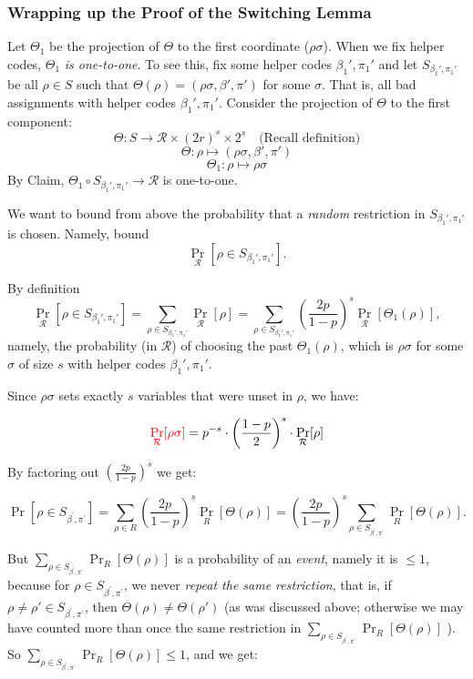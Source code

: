 \begin{note}
\subsubsection{Wrapping up  the Proof of the Switching Lemma}


Let \( \Theta_1 \) be the projection of \( \Theta \) to the first coordinate (\(\rho{\sigma}\)).
   When we fix helper codes, \( \Theta_1 \) \emph{is one-to-one}.
To see this, fix some helper codes \( \beta_1', \pi_1' \) and let \( S_{\beta_1', \pi_1'} \) be all \( \rho \in S \) such that \( \Theta(\rho) = (\rho{\sigma}, \beta', \pi') \) for some \( \sigma \). That is, all bad assignments with helper codes \( \beta_1', \pi_1' \).
Consider the projection of \( \Theta \) to the first component:
\[
\Theta: S \to \mathcal{R} \times (2r)^s \times 2^s \quad \text{(Recall definition)}
\]
\[
\Theta: \rho \mapsto (\rho{\sigma}, \beta', \pi')
\]
\[
\Theta_1: \rho \mapsto \rho{\sigma}
\]
By Claim, \( \Theta_1 \circ S_{\beta_1',\pi_1'} \to \mathcal{R} \) is one-to-one.

\medskip 
We want to bound from above the probability that a \textit{random} restriction in \( S_{\beta_1', \pi_1'} \) is chosen.
Namely, bound
\[
\Pr_{\mathcal{R}} [\rho \in S_{\beta_1', \pi_1'}].
\]

By definition
\[
\Pr_{\mathcal{R}} [\rho \in S_{\beta_1', \pi_1'}] = \sum_{\rho \in S_{\beta_1', \pi_1'}} \Pr_{\mathcal{R}} [\rho] = \sum_{\rho \in S_{\beta_1', \pi_1'}} \left( \frac{2p}{1-p} \right)^s \Pr_{\mathcal{R}} [\Theta_1(\rho)],
\]
namely, the probability (in \( \mathcal{R} \)) of choosing the past \( \Theta_1(\rho) \), which is \( \rho{\sigma} \) for some \( \sigma \) of size \( s \) with helper codes \( \beta_1', \pi_1' \).

 
Since \( \rho\sigma \) sets exactly \( s \) variables that were unset in \( \rho \), we have:

\[
\textcolor{red}{\Pr_{\mathcal{R}} [\rho\sigma]} = p^{-s} \cdot \left( \frac{1-p}{2} \right)^s \cdot \Pr_{\mathcal{R}} [\rho]
\]

By factoring out \( \left( \frac{2p}{1 - p} \right)^s \) we get:

\[
\Pr \left[ \rho \in S_{\beta^{'},\pi^{'}} \right] = \sum_{\rho \in R} \left( \frac{2p}{1 - p} \right)^s \Pr_R [\Theta(\rho)]
= \left( \frac{2p}{1 - p} \right)^s \sum_{\rho \in S_{\beta^{'},\pi^{'}}} \Pr_R [\Theta(\rho)].
\]

But \( \sum_{\rho \in S_{\beta^{'},\pi^{'}}} \Pr_R [\Theta(\rho)] \) is a probability of an \emph{event}, namely it is \( \leq 1 \), because for \( \rho \in S_{\beta^{'},\pi^{'}} \), we never 
\emph{repeat the same restriction}, that is, if \( \rho \neq \rho' \in S_{\beta^{'},\pi^{'}} \), then \( \Theta(\rho) \neq \Theta(\rho') \) (as was discussed above; otherwise we may have counted more than once the same restriction in \( \sum_{\rho \in S_{\beta^{'},\pi^{'}}} \Pr_R [\Theta(\rho)] \) ).
So \( \sum_{\rho \in S_{\beta^{'},\pi^{'}}} \Pr_R [\Theta(\rho)] \leq 1 \), and we get:


\end{note}

